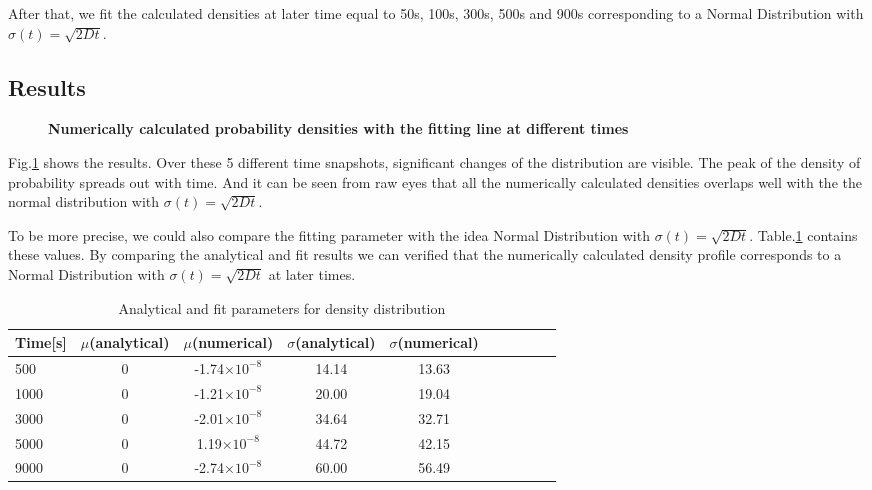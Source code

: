 \documentclass[11pt, oneside]{article}  	%
\begin{document}
After that, we fit the calculated densities at later time equal to 50s, 100s, 300s, 500s and 900s corresponding to a Normal Distribution with $\sigma(t)=\sqrt{2Dt}$.

\subsection{Results}
 
 \begin{figure}[htbp]
\begin{center}
\caption{{\bf   Numerically calculated probability densities with the fitting line at different times }}
\label{fig2}
\end{center}
\end{figure}

Fig.\ref{fig2} shows the results.  Over these 5 different time snapshots, significant changes of the distribution are visible. The peak of the density of probability  spreads out with time.
And it can be seen from raw eyes that all the numerically calculated densities overlaps well with the the normal distribution with $\sigma(t)=\sqrt{2Dt}$.

To be more precise, we could also compare the fitting parameter with the idea Normal Distribution with $\sigma(t)=\sqrt{2Dt}$. Table.\ref{table1} contains these values. By comparing the analytical and fit results we can verified that the numerically calculated density profile corresponds to a Normal Distribution with $\sigma(t)=\sqrt{2Dt}$ at later times. 

\begin{table}[htdp]
\caption{Analytical and fit parameters for density distribution}
\begin{center}
\begin{tabular}{l*{8}{c}r}
Time[s]              & $\mu$(analytical) & $\mu$(numerical)& $\sigma$(analytical) &$\sigma$(numerical)&  \\
\hline
500			&0	& -1.74$\times10^{-8}$ 	&14.14		&13.63  \\
1000			&0	&-1.21$\times10^{-8}$	&20.00		&19.04   \\
3000			&0 	& -2.01$\times10^{-8}$ 	&34.64		&32.71   \\
5000			&0 	& 1.19$\times10^{-8}$ 	&44.72		&42.15  \\
9000			&0 	& -2.74$\times10^{-8}$ 	&60.00		&56.49	\\
\end{tabular}
\end{center}
\label{table1}
\end{table}
\end{document}
